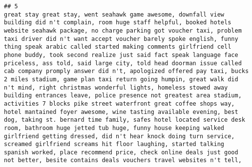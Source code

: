 \documentclass[
]{article}
\begin{document}
\begin{verbatim}
## 5                                                                                                                                                                                                                                                                                                                                                                                                                         great stay great stay, went seahawk game awesome, downfall view building did n't complain, room huge staff helpful, booked hotels website seahawk package, no charge parking got voucher taxi, problem taxi driver did n't want accept voucher barely spoke english, funny thing speak arabic called started making comments girlfriend cell phone buddy, took second realize just said fact speak language face priceless, ass told, said large city, told head doorman issue called cab company promply answer did n't, apologized offered pay taxi, bucks 2 miles stadium, game plan taxi return going humpin, great walk did n't mind, right christmas wonderful lights, homeless stowed away building entrances leave, police presence not greatest area stadium, activities 7 blocks pike street waterfront great coffee shops way, hotel mantained foyer awesome, wine tasting available evening, best dog, taking st. bernard time family, safes hotel located service desk room, bathroom huge jetted tub huge, funny house keeping walked girlfriend getting dressed, did n't hear knock doing turn service, screamed girlfriend screams hit floor laughing, started talking spanish worked, place recommend price, check online deals just good not better, besite contains deals vouchers travel websites n't tell,  

\end{verbatim}
\end{document}
